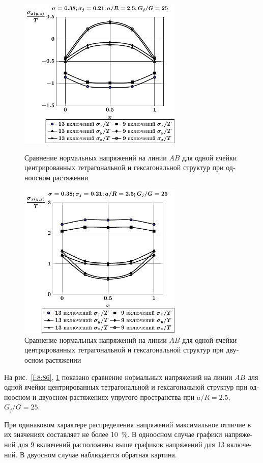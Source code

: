 \begin{russian}
\begin{figure}[h!]
\centering\footnotesize
\parbox[b]{7.5cm}{\centering\includegraphics[width=7.8cm]{inc13-9-a25-d95-g25-t1.pdf}
\caption{Сравнение нормальных напряжений на линии $AB$ для одной ячейки центрированных тетрагональной и гексагональной структур при одноосном растяжении
\label{f:8:86}}}\hfil\hfil
\parbox[b]{7.5cm}{\centering\includegraphics[width=7.8cm]{inc13-9-a25-d95-g25-t2.pdf}
\caption{Сравнение нормальных напряжений на линии $AB$ для одной ячейки центрированных тетрагональной и гексагональной структур при двуосном растяжении
\label{f:8:87}}}
\end{figure}

На рис.~\ref{f:8:86}, \ref{f:8:87} показано сравнение нормальных напряжений на линии $AB$ для одной ячейки центрированных тетрагональной и гексагональной структур при одноосном и двуосном растяжениях упругого пространства при $a/R=2.5$, $G_j/G=25$.

При одинаковом характере распределения напряжений максимальное отличие в их значениях составляет не более 10~\%. В одноосном случае графики напряжений для 9 включений расположены выше графиков напряжений для 13 включений. В двуосном случае наблюдается обратная картина.
\end{russian}